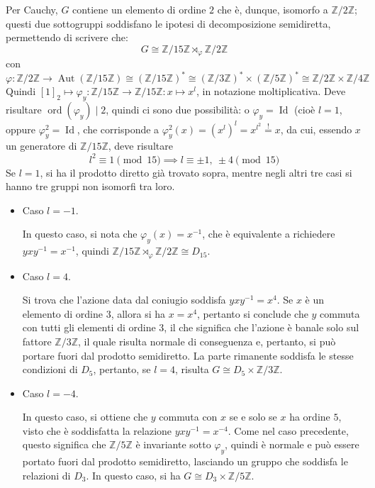 \documentclass[12pt]{scrartcl}
\theoremstyle{style}
\numberwithin{equation}{subsection}
\begin{document}
Per Cauchy, $G$ contiene un elemento di ordine $2$ che \`e, dunque, isomorfo a $\mathbb{Z}/2\mathbb{Z}$; questi due sottogruppi soddisfano le ipotesi di decomposizione semidiretta, permettendo di scrivere che:
\[
G \cong \mathbb{Z}/15\mathbb{Z} \rtimes _\varphi  \mathbb{Z}/2\mathbb{Z}
\] 
con
\[
\varphi :\mathbb{Z}/2\mathbb{Z} \longrightarrow \operatorname{Aut} (\mathbb{Z}/15\mathbb{Z}) \cong (\mathbb{Z}/15\mathbb{Z})^*\cong (\mathbb{Z}/3\mathbb{Z})^* \times (\mathbb{Z}/5\mathbb{Z})^*\cong \mathbb{Z}/2\mathbb{Z} \times \mathbb{Z}/4\mathbb{Z}
\] 
Quindi $[1]_2\mapsto \varphi _y:\mathbb{Z}/15\mathbb{Z}\longrightarrow \mathbb{Z}/15\mathbb{Z} : x\longmapsto x^{l}$, in notazione moltiplicativa. 
Deve risultare $\operatorname{ord}(\varphi _y)  \mid 2$, quindi ci sono due possibilit\`a: o $\varphi _y = \operatorname{Id} $ (cio\`e $l=1$, oppure $\varphi _y^2 = \operatorname{Id} $, che corrisponde a $\varphi ^2_y (x) = (x^l)^l= x^{l^2} \stackrel{!}{=} x$, da cui, essendo $x$ un generatore di $\mathbb{Z}/15\mathbb{Z}$, deve risultare 
\[
l^2 \equiv 1 \pmod{15} \implies l \equiv \pm 1, \ \pm 4 \pmod{15} 
\] 
Se $l=1$, si ha il prodotto diretto gi\`a trovato sopra, mentre negli altri tre casi si hanno tre gruppi non isomorfi tra loro.
\begin{itemize}
	\item Caso $l=-1$.

		In questo caso, si nota che $\varphi _y(x) = x^{-1}$, che \`e equivalente a richiedere $yxy^{-1} = x^{-1}$, quindi $\mathbb{Z}/15\mathbb{Z}\rtimes _\varphi \mathbb{Z}/2\mathbb{Z}\cong D_{15}$.
	\item Caso $l = 4$.

		Si trova che l'azione data dal coniugio soddisfa $yxy^{-1}=x^4$.
		Se $x$ \`e un elemento di ordine $3$, allora si ha $x = x^4$, pertanto si conclude che $y$ commuta con tutti gli elementi di ordine $3$, il che significa che l'azione \`e banale solo sul fattore $\mathbb{Z}/3\mathbb{Z}$, il quale risulta normale di conseguenza e, pertanto, si pu\`o portare fuori dal prodotto semidiretto.
		La parte rimanente soddisfa le stesse condizioni di $D_5$, pertanto, se $l=4$, risulta $G\cong D_5\times \mathbb{Z}/3\mathbb{Z}$.
	\item Caso $l=-4$.

		In questo caso, si ottiene che $y$ commuta con $x$ se e solo se $x$ ha ordine $5$, visto che \`e soddisfatta la relazione $yxy^{-1}=x^{-4}$.
		Come nel caso precedente, questo significa che $\mathbb{Z}/5\mathbb{Z}$ \`e invariante sotto $\varphi _y$, quindi \`e normale e pu\`o essere portato fuori dal prodotto semidiretto, lasciando un gruppo che soddisfa le relazioni di $D_3$.
In questo caso, si ha $G \cong D_3 \times \mathbb{Z}/5\mathbb{Z}$.
\end{itemize}
\end{document}
